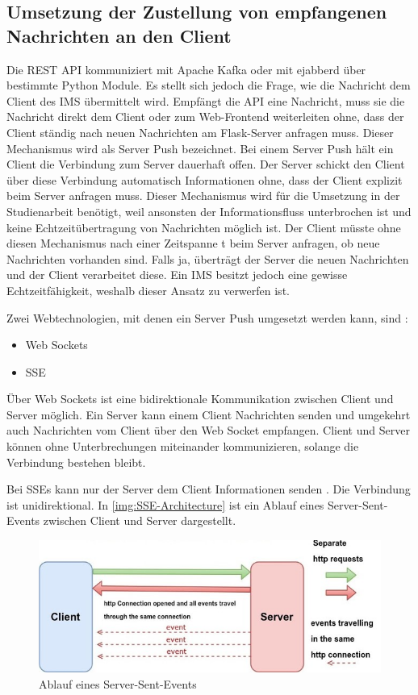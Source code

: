 \documentclass[a4paper,titlepage,halfparskip,12pt]{scrreprt}
\begin{document}
\begin{onehalfspacing}
\section{Umsetzung der Zustellung von empfangenen Nachrichten an den Client}

Die \acs{REST} \acs{API} kommuniziert mit Apache Kafka oder mit ejabberd über bestimmte Python Module. Es stellt sich jedoch die Frage, wie die Nachricht dem Client des \acs{IMS} übermittelt wird. Empfängt die \acs{API} eine Nachricht, muss sie die Nachricht direkt dem Client oder zum Web-Frontend weiterleiten ohne, dass der Client ständig nach neuen Nachrichten am Flask-Server anfragen muss. Dieser Mechanismus wird als Server Push bezeichnet. Bei einem Server Push \cite{sseVSwebsockets} hält ein Client die Verbindung zum Server dauerhaft offen. Der Server schickt den Client über diese Verbindung automatisch Informationen ohne, dass der Client explizit beim Server anfragen muss. Dieser Mechanismus wird für die Umsetzung in der Studienarbeit benötigt, weil ansonsten der Informationsfluss unterbrochen ist und keine Echtzeitübertragung von Nachrichten möglich ist. Der Client müsste ohne diesen Mechanismus nach einer Zeitspanne t beim Server anfragen, ob neue Nachrichten vorhanden sind. Falls ja, überträgt der Server die neuen Nachrichten und der Client verarbeitet diese. Ein \acs{IMS} besitzt jedoch eine gewisse Echtzeitfähigkeit, weshalb dieser Ansatz zu verwerfen ist.

Zwei Webtechnologien, mit denen ein Server Push umgesetzt werden kann, sind \cite{sseVSwebsockets}:

\begin{itemize}
\item Web Sockets
\item \ac{SSE}
\end{itemize}

Über Web Sockets ist eine bidirektionale Kommunikation zwischen Client und Server möglich. Ein Server kann einem Client Nachrichten senden und umgekehrt auch Nachrichten vom Client über den Web Socket empfangen. Client und Server können ohne Unterbrechungen miteinander kommunizieren, solange die Verbindung bestehen bleibt.\cite{sseVSwebsockets}

Bei \ac{SSE}s kann nur der Server dem Client Informationen senden \cite{sseMorzilla, sseVSwebsockets}. Die Verbindung ist unidirektional. In \autoref{img:SSE-Architecture} ist ein Ablauf eines Server-Sent-Events zwischen Client und Server dargestellt.

\begin{figure}[h]
	\centering
	\includegraphics[width=.8\textwidth]{images/SSE-Architecture}
	\caption{Ablauf eines Server-Sent-Events \cite{sseFunctionGraphic}}
	\label{img:SSE-Architecture}
\end{figure}


\end{onehalfspacing}
\end{document}
